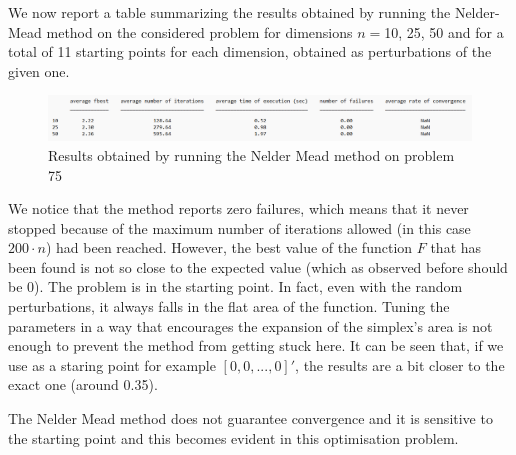 We now report a table summarizing the results obtained by running the Nelder-Mead method
on the considered problem for dimensions $n=$10, 25, 50 and for a total of 11 starting 
points for each dimension, obtained as perturbations of the given one.

\begin{figure}[H]
    \centering
    \includegraphics[width=1\textwidth]{img/pb75_table_SX.png}
    \caption{Results obtained by running the Nelder Mead method on problem 75}
\label{pb 75 table SX}
\end{figure}

We notice that the method reports zero failures, which means that it never stopped because of the maximum 
number of iterations allowed (in this case $200\cdot n$) had been reached. However, the best value of the 
function $F$ that has been found is not so close to the expected value (which as observed before should be 0).
The problem is in the starting point. In fact, even with the random perturbations, it always falls in the flat area 
of the function. Tuning the parameters in a way that encourages the expansion of the simplex's area is not enough 
to prevent the method from getting stuck here. It can be seen that, if we use as a staring point for example $[0,0,...,0]'$, 
the results are a bit closer to the exact one (around 0.35). 

The Nelder Mead method does not guarantee convergence and it is sensitive to the starting point and this becomes evident 
in this optimisation problem.
